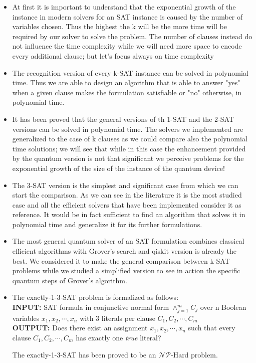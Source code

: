 \documentclass[english]{article}
\begin{document}
			\begin{itemize}
				\item At first it is important to understand that the exponential growth of the instance in modern solvers for an SAT instance is caused by the number of variables chosen. Thus the highest the k will be the more time will be required by our solver to solve the problem. The number of clauses instead do not influence the time complexity while we will need more space to encode every additional clause; but let's focus always on time complexity
				
				\item The recognition version of every k-SAT instance can be solved in polynomial time. Thus we are able to design an algorithm that is able to answer "yes" when a given clause makes the formulation satisfiable or "no" otherwise, in polynomial time.
				
				\item It has been proved that the general versions of th 1-SAT and the 2-SAT versions can be solved in polynomial time. The solvers we implemented are generalized to the case of k clauses as we could compare also the polynomial time solutions; we will see that while in this case the enhancement provided by the quantum version is not that significant we perceive problems for the exponential growth of the size of the instance of the quantum device!
				
				\item The 3-SAT version is the simplest and significant case from which we can start the comparison. As we can see in the literature it is the most studied case and all the efficient solvers that have been implemented consider it as reference. It would be in fact sufficient to find an algorithm that solves it in polynomial time and generalize it for its further formulations.
				
				\item The most general quantum solver of an SAT formulation combines classical efficient algorithms with Grover's search and qiskit version is already the best. We considered it to make the general comparison between k-SAT problems while we studied a simplified version to see in action the specific quantum steps of Grover's algorithm.
				
				\item The exactly-1-3-SAT problem is formalized as follows: \\
				
				\hspace{0.3cm} \textbf{INPUT:} SAT formula in conjunctive normal form $\land_{j = 1}^{m}C_j$ over n Boolean variables $x_1,x_2,\cdots,x_n$ with 3 literals per clause $C_1,C_2,\cdots,C_m$ \\
				
				\hspace{0.3cm} \textbf{OUTPUT:} Does there exist an assignment $x_1,x_2,\cdots,x_n$ such that every clause $C_1,C_2,\cdots,C_m$ has exactly one \emph{true} literal?
				
				The exactly-1-3-SAT has been proved to be an $\mathcal{N}\mathcal{P}$-Hard problem.
			\end{itemize}
			
\end{document}
